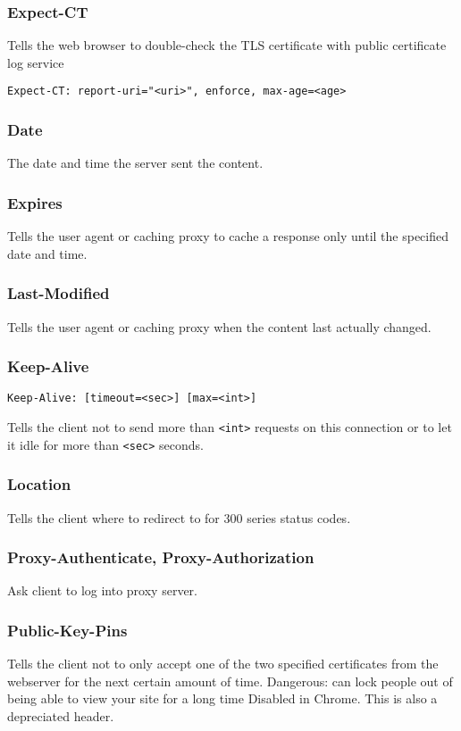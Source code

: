 \documentclass[../CMPUT-404-Notes.tex]{subfiles}
\begin{document}
\subsubsection{Expect-CT}
Tells the web browser to double-check the TLS certificate with public certificate log service

\texttt{Expect-CT: report-uri="<uri>",
enforce,
max-age=<age>}

\subsubsection{Date}
The date and time the server sent the content.

\subsubsection{Expires}
Tells the user agent or caching proxy to cache a response only until the specified date and time.

\subsubsection{Last-Modified}
Tells the user agent or caching proxy when the content last actually changed.

\subsubsection{Keep-Alive}
\texttt{Keep-Alive: [timeout=<sec>] [max=<int>]} 

Tells the client not to send more than \texttt{<int>} requests on this connection or to let it idle for more than \texttt{<sec>} seconds.

\subsubsection{Location}
Tells the client where to redirect to for 300 series status codes.

\subsubsection{Proxy-Authenticate, Proxy-Authorization}
Ask client to log into proxy server.

\subsubsection{Public-Key-Pins}
Tells the client not to only accept one of the two specified certificates from the webserver for the next certain amount of time.
Dangerous: can lock people out of being able to view your site for a long time
Disabled in Chrome. This is also a depreciated header.
\end{document}
